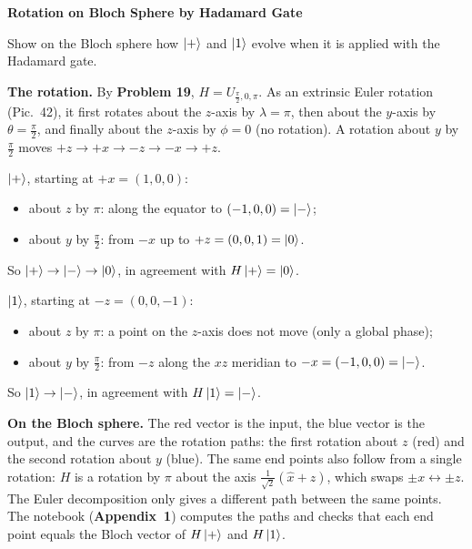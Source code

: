 \documentclass[a4paper, 10pt]{article}
\begin{document}
\begin{problem}
\textbf{Rotation on Bloch Sphere by Hadamard Gate}
\par Show on the Bloch sphere how \( \ket{+} \) and \( \ket{1} \) evolve when it is applied with the Hadamard gate.
\end{problem}

\begin{solution}
	\noindent \textbf{The rotation.} By \textbf{Problem 19}, \( H = U_{\frac{\pi}{2}, 0, \pi} \). As an extrinsic Euler rotation (Pic.~42), it first rotates about the \( z \)-axis by \( \lambda = \pi \), then about the \( y \)-axis by \( \theta = \tfrac{\pi}{2} \), and finally about the \( z \)-axis by \( \phi = 0 \) (no rotation).
	A rotation about \( y \) by \( \tfrac{\pi}{2} \) moves \( +z \to +x \to -z \to -x \to +z \).

	\myspace

	\noindent \textbf{\( \ket{+} \)}, starting at \( +x = (1, 0, 0) \):
	\begin{itemize}
		\item about \( z \) by \( \pi \): along the equator to \( (-1, 0, 0) = \ket{-} \);
		\item about \( y \) by \( \tfrac{\pi}{2} \): from \( -x \) up to \( +z = (0, 0, 1) = \ket{0} \).
	\end{itemize}
	So \( \ket{+} \to \ket{-} \to \ket{0} \), in agreement with \( H\ket{+} = \ket{0} \).

	\noindent \textbf{\( \ket{1} \)}, starting at \( -z = (0, 0, -1) \):
	\begin{itemize}
		\item about \( z \) by \( \pi \): a point on the \( z \)-axis does not move (only a global phase);
		\item about \( y \) by \( \tfrac{\pi}{2} \): from \( -z \) along the \( xz \) meridian to \( -x = (-1, 0, 0) = \ket{-} \).
	\end{itemize}
	So \( \ket{1} \to \ket{-} \), in agreement with \( H\ket{1} = \ket{-} \).

	\myspace

	\noindent \textbf{On the Bloch sphere.} The red vector is the input, the blue vector is the output, and the curves are the rotation paths: the first rotation about \( z \) (red) and the second rotation about \( y \) (blue).
	\noindent The same end points also follow from a single rotation: \( H \) is a rotation by \( \pi \) about the axis \( \tfrac{1}{\sqrt{2}}(\hat{x} + \hat{z}) \), which swaps \( \pm x \leftrightarrow \pm z \).
	The Euler decomposition only gives a different path between the same points. The notebook (\textbf{Appendix~1}) computes the paths and checks that each end point equals the Bloch vector of \( H\ket{+} \) and \( H\ket{1} \).
\end{solution}
\end{document}

